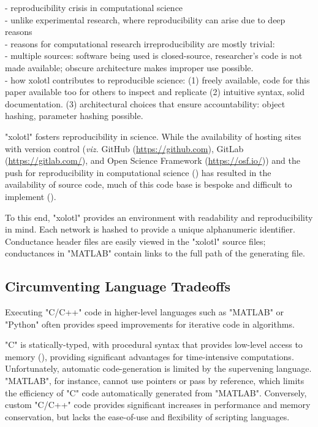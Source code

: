 \documentclass{frontiersSCNS} %
\newcommand{\viz}{\textit{viz.}\xspace}
\begin{document}
- reproducibility crisis in computational science \\
- unlike experimental research, where reproducibility can arise due to deep reasons \\
- reasons for computational research irreproducibility are mostly trivial:  \\
- multiple sources: software being used is closed-source, researcher's code is not made available; obscure architecture makes improper use possible.  \\
- how xolotl contributes to reproducible science: (1) freely available, code for this paper available too for others to inspect and replicate (2) intuitive syntax, solid documentation. (3) architectural choices that ensure accountability: object hashing, parameter hashing possible. 


"xolotl" fosters reproducibility in science. While the availability of hosting sites with version control (\viz GitHub (\url{https://github.com}), GitLab (\url{https://gitlab.com/}), and Open Science Framework (\url{https://osf.io/})) and the push for reproducibility in computational science (\cite{eklundClusterFailureWhy2016, stoddenEnhancingReproducibilityComputational2016, bakerWhyScientistsMust2016}) has resulted in the availability of source code, much of this code base is bespoke and difficult to implement (\cite{sedanoCodeReadabilityTesting2016, xuMeasurementSourceCode2017}).

To this end, "xolotl" provides an environment with readability and reproducibility in mind. Each network is hashed to provide a unique alphanumeric identifier. Conductance header files are easily viewed in the "xolotl" source files; conductances in "MATLAB" contain links to the full path of the generating file.

\subsection{Circumventing Language Tradeoffs}

Executing "C/C++" code in higher-level languages such as "MATLAB" or "Python" often provides speed improvements for iterative code in algorithms. 

"C" is statically-typed, with procedural syntax that provides low-level access to memory (\cite{kernighanProgrammingLanguage1978}), providing significant advantages for time-intensive computations. Unfortunately, automatic code-generation is limited by the supervening language. "MATLAB", for instance, cannot use pointers or pass by reference, which limits the efficiency of "C" code automatically generated from "MATLAB". Conversely, custom "C/C++" code provides significant increases in performance and memory conservation, but lacks the ease-of-use and flexibility of scripting languages.
\end{document}
